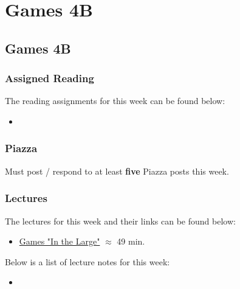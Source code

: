 \clearpage

\renewcommand{\ChapTitle}{Games 4B}
\renewcommand{\SectionTitle}{Games 4B}

\chapter{\ChapTitle}
\section{\SectionTitle}

\subsection{Assigned Reading}

The reading assignments for this week can be found below:

\begin{itemize}
    \item {}
\end{itemize}

\subsection{Piazza}

Must post / respond to at least \textbf{five} Piazza posts this week.

\subsection{Lectures}

The lectures for this week and their links can be found below:

\begin{itemize}
    \item \href{https://www.youtube.com/watch?v=JiY4qqxsVag}{Games "In the Large"} $\approx$ 49 min.
\end{itemize}

\noindent Below is a list of lecture notes for this week:

\begin{itemize}
    \item {}
\end{itemize}

